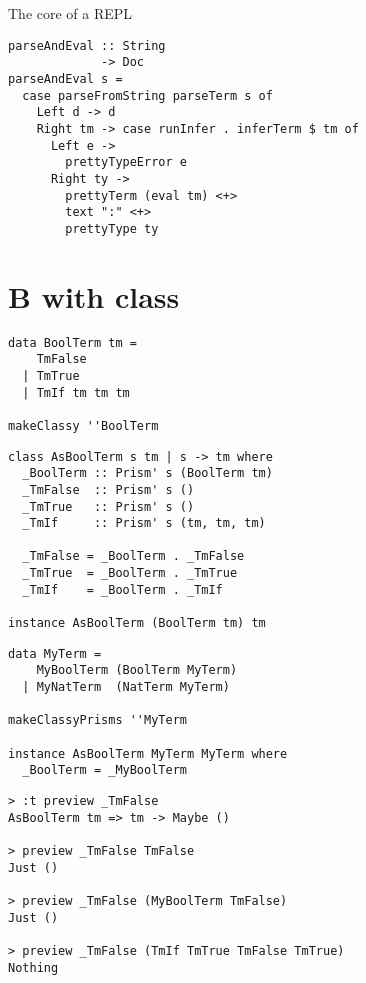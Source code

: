 \documentclass{beamer}
\begin{document}
\begin{frame}[fragile]
  \begin{center}
   The core of a REPL 
  \end{center}
  \begin{verbatim}
parseAndEval :: String
             -> Doc
parseAndEval s =
  case parseFromString parseTerm s of
    Left d -> d
    Right tm -> case runInfer . inferTerm $ tm of
      Left e -> 
        prettyTypeError e
      Right ty ->
        prettyTerm (eval tm) <+> 
        text ":" <+> 
        prettyType ty
  \end{verbatim}
\end{frame} 

\section{B with class}

\begin{frame}[fragile]
  \begin{verbatim}
data BoolTerm tm =
    TmFalse
  | TmTrue
  | TmIf tm tm tm

makeClassy ''BoolTerm
  \end{verbatim}
\end{frame} 

\begin{frame}[fragile]
  \begin{verbatim}
class AsBoolTerm s tm | s -> tm where
  _BoolTerm :: Prism' s (BoolTerm tm)
  _TmFalse  :: Prism' s ()
  _TmTrue   :: Prism' s ()
  _TmIf     :: Prism' s (tm, tm, tm)

  _TmFalse = _BoolTerm . _TmFalse
  _TmTrue  = _BoolTerm . _TmTrue
  _TmIf    = _BoolTerm . _TmIf

instance AsBoolTerm (BoolTerm tm) tm
  \end{verbatim}
\end{frame} 

\begin{frame}[fragile]
  \begin{verbatim}
data MyTerm =
    MyBoolTerm (BoolTerm MyTerm)
  | MyNatTerm  (NatTerm MyTerm)

makeClassyPrisms ''MyTerm

instance AsBoolTerm MyTerm MyTerm where
  _BoolTerm = _MyBoolTerm
  \end{verbatim}
\end{frame} 

\begin{frame}[fragile]
  \begin{verbatim}
> :t preview _TmFalse
AsBoolTerm tm => tm -> Maybe ()

> preview _TmFalse TmFalse
Just ()

> preview _TmFalse (MyBoolTerm TmFalse)
Just ()

> preview _TmFalse (TmIf TmTrue TmFalse TmTrue)
Nothing
  \end{verbatim}
\end{frame} 
\end{document}
